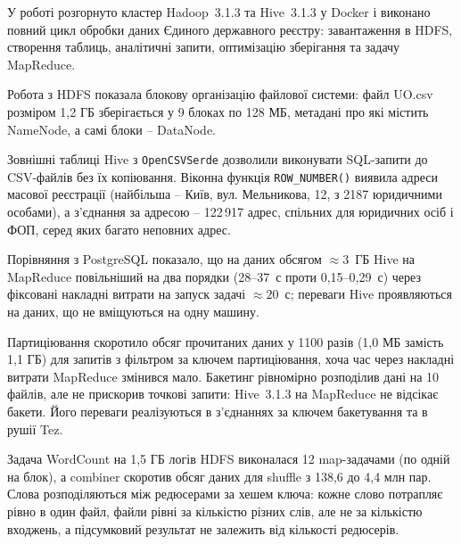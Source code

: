 \documentclass{iasa-lab}
\begin{document}

У роботі розгорнуто кластер Hadoop~3.1.3 та Hive~3.1.3 у Docker і виконано повний цикл обробки даних Єдиного державного реєстру: завантаження в HDFS, створення таблиць, аналітичні запити, оптимізацію зберігання та задачу MapReduce.

Робота з HDFS показала блокову організацію файлової системи: файл UO.csv розміром 1,2 ГБ зберігається у 9 блоках по 128 МБ, метадані про які містить NameNode, а самі блоки -- DataNode.

Зовнішні таблиці Hive з \texttt{OpenCSVSerde} дозволили виконувати SQL-запити до CSV-файлів без їх копіювання. Віконна функція \texttt{ROW\_NUMBER()} виявила адреси масової реєстрації (найбільша -- Київ, вул. Мельникова, 12, з 2187 юридичними особами), а з'єднання за адресою -- 122\,917 адрес, спільних для юридичних осіб і ФОП, серед яких багато неповних адрес.

Порівняння з PostgreSQL показало, що на даних обсягом $\approx 3$~ГБ Hive на MapReduce повільніший на два порядки (28--37~с проти 0,15--0,29~с) через фіксовані накладні витрати на запуск задачі $\approx 20$~с; переваги Hive проявляються на даних, що не вміщуються на одну машину.

Партиціювання скоротило обсяг прочитаних даних у 1100 разів (1,0 МБ замість 1,1 ГБ) для запитів з фільтром за ключем партиціювання, хоча час через накладні витрати MapReduce змінився мало. Бакетинг рівномірно розподілив дані на 10 файлів, але не прискорив точкові запити: Hive~3.1.3 на MapReduce не відсікає бакети. Його переваги реалізуються в з'єднаннях за ключем бакетування та в рушії Tez.

Задача WordCount на 1,5 ГБ логів HDFS виконалася 12 map-задачами (по одній на блок), а combiner скоротив обсяг даних для shuffle з 138,6 до 4,4 млн пар. Слова розподіляються між редюсерами за хешем ключа: кожне слово потрапляє рівно в один файл, файли рівні за кількістю різних слів, але не за кількістю входжень, а підсумковий результат не залежить від кількості редюсерів.

\printbibliography[heading=bibintoc, title={Список використаних джерел}]

\clearpage
{}
\end{document}
